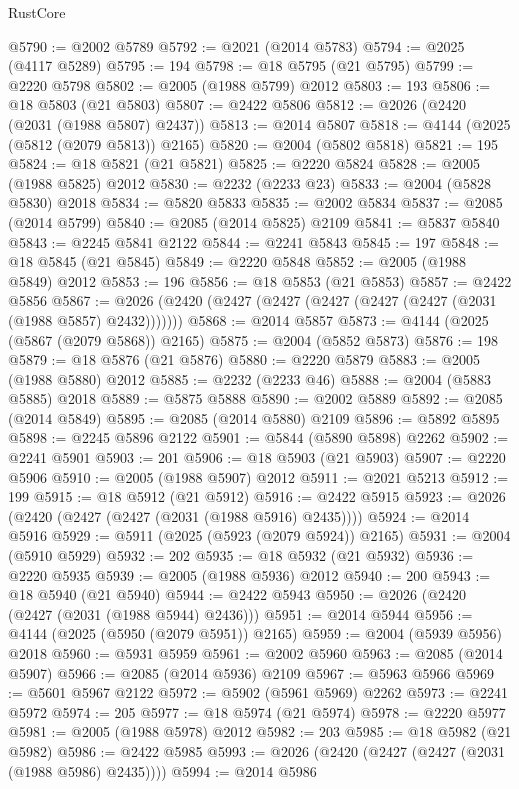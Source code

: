 \begin{lexlean}{RustCore}
\begin{coremodule}
@5790 := @2002 @5789
@5792 := @2021 (@2014 @5783)
@5794 := @2025 (@4117 @5289)
@5795 := 194
@5798 := @18 @5795 (@21 @5795)
@5799 := @2220 @5798
@5802 := @2005 (@1988 @5799) @2012
@5803 := 193
@5806 := @18 @5803 (@21 @5803)
@5807 := @2422 @5806
@5812 := @2026 (@2420 (@2031 (@1988 @5807) @2437))
@5813 := @2014 @5807
@5818 := @4144 (@2025 (@5812 (@2079 @5813)) @2165)
@5820 := @2004 (@5802 @5818)
@5821 := 195
@5824 := @18 @5821 (@21 @5821)
@5825 := @2220 @5824
@5828 := @2005 (@1988 @5825) @2012
@5830 := @2232 (@2233 @23)
@5833 := @2004 (@5828 @5830) @2018
@5834 := @5820 @5833
@5835 := @2002 @5834
@5837 := @2085 (@2014 @5799)
@5840 := @2085 (@2014 @5825) @2109
@5841 := @5837 @5840
@5843 := @2245 @5841 @2122
@5844 := @2241 @5843
@5845 := 197
@5848 := @18 @5845 (@21 @5845)
@5849 := @2220 @5848
@5852 := @2005 (@1988 @5849) @2012
@5853 := 196
@5856 := @18 @5853 (@21 @5853)
@5857 := @2422 @5856
@5867 := @2026 (@2420 (@2427 (@2427 (@2427 (@2427 (@2427 (@2031 (@1988 @5857) @2432)))))))
@5868 := @2014 @5857
@5873 := @4144 (@2025 (@5867 (@2079 @5868)) @2165)
@5875 := @2004 (@5852 @5873)
@5876 := 198
@5879 := @18 @5876 (@21 @5876)
@5880 := @2220 @5879
@5883 := @2005 (@1988 @5880) @2012
@5885 := @2232 (@2233 @46)
@5888 := @2004 (@5883 @5885) @2018
@5889 := @5875 @5888
@5890 := @2002 @5889
@5892 := @2085 (@2014 @5849)
@5895 := @2085 (@2014 @5880) @2109
@5896 := @5892 @5895
@5898 := @2245 @5896 @2122
@5901 := @5844 (@5890 @5898) @2262
@5902 := @2241 @5901
@5903 := 201
@5906 := @18 @5903 (@21 @5903)
@5907 := @2220 @5906
@5910 := @2005 (@1988 @5907) @2012
@5911 := @2021 @5213
@5912 := 199
@5915 := @18 @5912 (@21 @5912)
@5916 := @2422 @5915
@5923 := @2026 (@2420 (@2427 (@2427 (@2031 (@1988 @5916) @2435))))
@5924 := @2014 @5916
@5929 := @5911 (@2025 (@5923 (@2079 @5924)) @2165)
@5931 := @2004 (@5910 @5929)
@5932 := 202
@5935 := @18 @5932 (@21 @5932)
@5936 := @2220 @5935
@5939 := @2005 (@1988 @5936) @2012
@5940 := 200
@5943 := @18 @5940 (@21 @5940)
@5944 := @2422 @5943
@5950 := @2026 (@2420 (@2427 (@2031 (@1988 @5944) @2436)))
@5951 := @2014 @5944
@5956 := @4144 (@2025 (@5950 (@2079 @5951)) @2165)
@5959 := @2004 (@5939 @5956) @2018
@5960 := @5931 @5959
@5961 := @2002 @5960
@5963 := @2085 (@2014 @5907)
@5966 := @2085 (@2014 @5936) @2109
@5967 := @5963 @5966
@5969 := @5601 @5967 @2122
@5972 := @5902 (@5961 @5969) @2262
@5973 := @2241 @5972
@5974 := 205
@5977 := @18 @5974 (@21 @5974)
@5978 := @2220 @5977
@5981 := @2005 (@1988 @5978) @2012
@5982 := 203
@5985 := @18 @5982 (@21 @5982)
@5986 := @2422 @5985
@5993 := @2026 (@2420 (@2427 (@2427 (@2031 (@1988 @5986) @2435))))
@5994 := @2014 @5986

\end{coremodule}
\end{lexlean}
